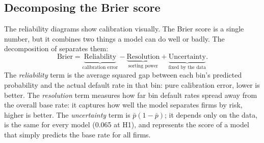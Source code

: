 \documentclass[12pt,a4paper]{article}
\begin{document}
\subsection{Decomposing the Brier score}

The reliability diagrams show calibration visually. The Brier score is a
single number, but it combines two things a model can do well or badly. The decomposition of \cite{murphy1973} separates them:
\begin{equation}
\text{Brier} = \underbrace{\text{Reliability}}_{\text{calibration error}}
             - \underbrace{\text{Resolution}}_{\text{sorting power}}
             + \underbrace{\text{Uncertainty}}_{\text{fixed by the data}} .
\label{eq:brier-decomp}
\end{equation}
The \emph{reliability} term is the average squared gap between each bin's
predicted probability and the actual default rate in that bin: pure
calibration error, lower is better. The \emph{resolution} term measures how
far bin default rates spread away from the overall base rate: it captures
how well the model separates firms by risk, higher is better. The
\emph{uncertainty} term is $\bar{p}(1-\bar{p})$; it depends only on the
data, is the same for every model (0.065 at H1), and represents the score
of a model that simply predicts the base rate for all firms.
\end{document}
